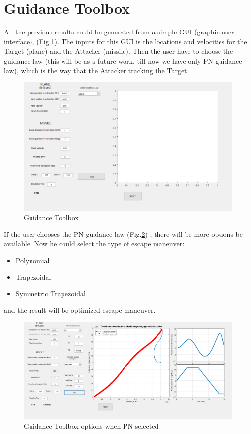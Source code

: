 
\section{Guidance Toolbox}

All the previous results could be generated from a simple GUI (graphic user interface), (Fig.\ref{Guidance Toolbox}).  The inputs for this GUI is the locations and velocities for the Target (plane) and the Attacker (missile). Then the user have to choose the guidance law (this will be as a future work, till now we have only PN guidance law), which is the way that the Attacker tracking the Target.

\begin{figure}[H]
	\centering
	\includegraphics[scale = 0.45]{fig/GUI.PNG}
	\caption{Guidance Toolbox}
	\label{Guidance Toolbox}
\end{figure}


If the user chooses the PN guidance law (Fig.\ref{Guidance Toolbox PN}) , there will be more options be available, Now he could select the type of escape maneuver:
\begin{itemize}
	\item Polynomial
	\item Trapezoidal
	\item Symmetric Trapezoidal
\end{itemize}

and the result will be optimized escape maneuver. 

\begin{figure}[H]
	\centering
	\includegraphics[scale = 0.4]{fig/guiPN.PNG}
	\caption{Guidance Toolbox options when PN selected}
	\label{Guidance Toolbox PN}
\end{figure}
  


